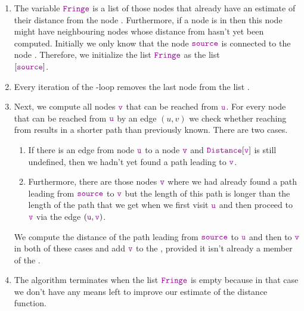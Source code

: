 \begin{enumerate}
      The node $\mytt{source}$ has distance $0$ from the node $\mytt{source}$ and initially this is
      all we know.  Hence, the dictionary $\mytt{Distance}$ is initialized as $\bigl\{\mytt{source}:0 \bigr\}$.
\item The variable $\mytt{Fringe}$ is a list of those nodes that already have an estimate of
      their distance from the  node .  Furthermore, if a node is in  then this
      node might have neighbouring nodes whose distance from  hasn't yet been computed. 
      Initially we only know that the node $\mytt{source}$ is connected to the node .
      Therefore, we initialize the list $\mytt{Fringe}$ as the list
      \\[-0.2cm]
      \hspace*{1.3cm}
      $[ \mytt{source} ]$.
\item Every iteration of the -loop removes the last node  from the list .
\item Next, we compute all nodes $\mytt{v}$ that can be reached from $\mytt{u}$. For every node 
      that can be reached from $\mytt{u}$ by an edge $(u, v)$ we check whether 
      reaching  from  results in a shorter path than previously known.
      There are two cases.
      \begin{enumerate}
      \item If there is an edge from node $\mytt{u}$ to a node $\mytt{v}$ and  $\mytt{Distance}[\mytt{v}]$ is still
            undefined, then we hadn't yet found a path leading to $\mytt{v}$.
      \item Furthermore, there are those nodes $\mytt{v}$ where we had already found a path leading from
            $\mytt{source}$ to $\mytt{v}$ but the length of this path is longer than the length of the path
            that we get when we first visit $\mytt{u}$ and then proceed to $\mytt{v}$ via the edge $(\mytt{u},\mytt{v})$.
      \end{enumerate}
      We compute the distance of the path leading from $\mytt{source}$ to $\mytt{u}$ and then to
      $\mytt{v}$ in both of these cases and add $\mytt{v}$ to the , provided it isn't
      already a member of the .
\item The algorithm terminates when the list $\mytt{Fringe}$ is empty because in that case we don't
      have any means left to improve our estimate of the distance function.
\end{enumerate}

